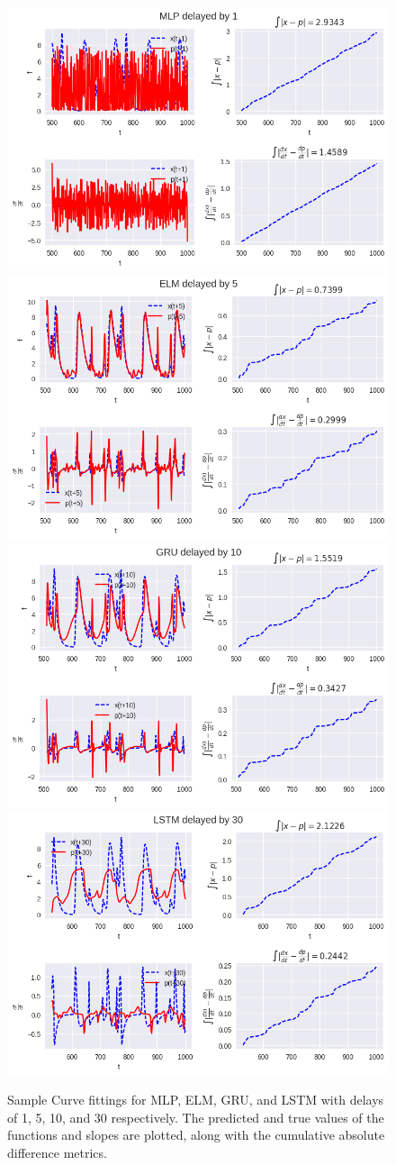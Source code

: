 \documentclass[11pt]{article}
\begin{document}
 \begin{figure}
   \begin{center}
   \includegraphics[width=.48\textwidth]{figures/MLP_1_mg2.png}
   \includegraphics[width=.48\textwidth]{figures/ELM_5_mg2.png}
   \includegraphics[width=.48\textwidth]{figures/GRU_10_mg2.png}
   \includegraphics[width=.48\textwidth]{figures/LSTM_30_mg2.png}
 \end{center}
 \caption{Sample Curve fittings for MLP, ELM, GRU, and LSTM with
   delays of 1, 5, 10, and 30 respectively. The predicted and true
   values of the functions and slopes are plotted, along with the
   cumulative absolute difference metrics.}
 \label{fig:mg2_func}
   \end{figure}



\end{document}
